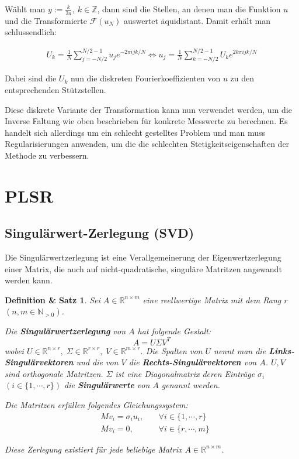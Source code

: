 \documentclass{article}
\newcommand{\R}[0]{\mathbb{R}}
\newtheorem{definthm}{Definition \& Satz}
\begin{document}
Wählt man $y := \frac{k}{2a}, \: k \in \mathbb{Z}$, dann sind die Stellen, an denen man die Funktion $u$ und die Transformierte $\mathcal{F}(u_N)$
auswertet äquidistant. Damit erhält man schlussendlich:

\begin{align}
    U_k = \frac{1}{N} \sum\limits_{j=-N/2}^{N/2-1} u_j e^{-2\pi ijk/N}
\iff u_j = \frac{1}{N} \sum\limits_{k=-N/2}^{N/2-1} U_k e^{2k\pi ijk/N}
\end{align}

Dabei sind die $U_k$ nun die diskreten Fourierkoeffizienten von $u$ zu den entsprechenden Stützstellen.

Diese diskrete Variante der Transformation kann nun verwendet werden, um die Inverse Faltung wie oben beschrieben für konkrete Messwerte zu berechnen. 
Es handelt sich allerdings um ein schlecht gestelltes Problem und man muss Regularisierungen anwenden, um die die schlechten Stetigkeitseigenschaften der Methode zu verbessern. 

\section{PLSR}


\subsection{Singulärwert-Zerlegung (SVD)}
Die Singulärwertzerlegung ist eine Verallgemeinerung der Eigenwertzerlegung einer Matrix, die auch auf nicht-quadratische, singuläre Matritzen angewandt werden kann.

\begin{definthm}
    Sei $A \in \R^{n \times m}$ eine reellwertige Matrix mit dem Rang $r$ $(n, m \in \mathbb{N}_{>0})$.

    Die \textbf{Singulärwertzerlegung} von $A$  hat folgende Gestalt:
    \begin{equation}
        A = U \Sigma V^T
    \end{equation}
    wobei $U \in \R^{n \times r}, \; \Sigma \in \R^{r \times r}, \; V \in \R^{m \times r}$.
    Die Spalten von $U$ nennt man die \textbf{Links-Singulärvektoren} und die von $V$ die \textbf{Rechts-Singulärvektoren} von $A$. $U, V$ sind orthogonale Matritzen.
    $\Sigma$ ist eine Diagonalmatrix deren Einträge $\sigma_i$ $(i \in \{1, \cdots, r\})$ die \textbf{Singulärwerte} von $A$ genannt werden.
    
    Die Matritzen erfüllen folgendes Gleichungssystem:
    \begin{align}
        &Mv_i = \sigma_i u_i, \:&&\forall i \in \{1, \cdots, r\} \\
        &Mv_i = 0, \: &&\forall i \in \{r, \cdots, m\}
    \end{align}

    Diese Zerlegung existiert für jede beliebige Matrix $A \in \R^{n \times m}$.
\end{definthm}
\end{document}
